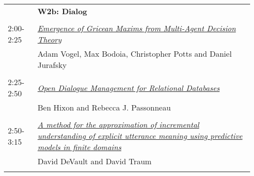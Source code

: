 \begin{tabular}{p{20mm}p{138mm}}
 & {\bf W2b: Dialog
} \\
\\
2:00-2:25 & \hyperlink{page.1072}{\em Emergence of Gricean Maxims from Multi-Agent Decision Theory}\\
         & Adam Vogel, Max Bodoia, Christopher Potts and Daniel Jurafsky \\
\\

2:25-2:50 & \hyperlink{page.1082}{\em Open Dialogue Management for Relational Databases}\\
         & Ben Hixon and Rebecca J. Passonneau \\
\\

2:50-3:15 & \hyperlink{page.1092}{\em A method for the approximation of incremental understanding of explicit utterance meaning using predictive models in finite domains}\\
         & David DeVault and David Traum \\
\\

\end{tabular}
\newpage

